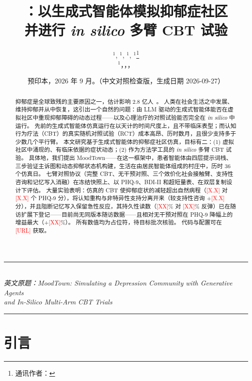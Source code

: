 \documentclass[11pt,a4paper]{article}
\title{\textbf{\sys：以生成式智能体模拟抑郁症社区\\并进行 \emph{in silico} 多臂 CBT 试验}}
\author{%
  \ph{作者 1}$^{1}$,\; \ph{作者 2}$^{1}$,\; \ph{作者 3}$^{1}$,\; \ph{作者 4}$^{1}$\thanks{通讯作者：\ph{email@example.org}}\\
  $^{1}$\ph{院系}，\ph{机构}，\ph{城市}，\ph{国家}
}
\date{预印本，2026 年 9 月。\quad（中文对照检查版，生成日期 2026-09-27）}
\newcommand{\ph}[1]{\textcolor{red}{[#1]}}
\newcommand{\sys}{MoodTown}
\begin{document}
\maketitle

\begin{center}
\rule{\textwidth}{0.5pt}\\[0.3em]
\small\textit{英文原题：MoodTown: Simulating a Depression Community with Generative Agents\\
and In-Silico Multi-Arm CBT Trials}\\[0.3em]
\rule{\textwidth}{0.5pt}
\end{center}

\vspace{0.5em}

\begin{abstract}
\noindent
抑郁症是全球致残的主要原因之一，估计影响 2.8 亿人~\citep{who2022}。
人类在社会生活之中发展、维持抑郁并从中恢复，这引出一个自然的问题：由 LLM 驱动的生成式智能体能否在虚拟社区中重现抑郁障碍的动态过程——以及心理治疗的对照试验能否完全在 \emph{in silico} 中运行。
先前的生成式智能体仿真运行在以天计的时间尺度上，且不带临床表型；而认知行为疗法（CBT）的真实随机对照试验（RCT）成本高昂、历时数月，且很少支持多于少数几个平行臂。
本文研究基于生成式智能体的抑郁症社区仿真，目标有二：(1) 虚拟社区中涌现的、有临床依据的症状动态；(2) 作为方法学工具的 \emph{in silico} 多臂 CBT 试验。
具体地，我们提出 \sys——在这一框架中，患者智能体由四层提示词栈、三步验证主诉图和动态抑郁状态机构建，生活在由居民智能体组成的村庄中，历时 36 个仿真日。
七臂对照协议（完整 CBT、无干预对照、三个效价化社会接触臂、支持性咨询和记忆写入消融）在冻结快照上、以 PHQ-9、BDI-II 和超短量表、在双层复制设计下评估。
大量实验表明：仿真的 CBT 使抑郁症状的减轻超出自然病程（\ph{X.X} 对 \ph{X.X} 个 PHQ-9 分），将认知重构与非特异性支持分离开来（较支持性咨询 +\ph{X.X} 分），并且阻断记忆写入保留急性反应，其持久性读数（\ph{XX}\% 对 \ph{XX}\% 反弹）已在随访扩展下登记——目前尚无同版本随访数据——且相对无干预对照在 PHQ-9 降幅上的增益最大（+\ph{XX}\%）。
所有数值均为占位符，待目标批次核验。
代码与配置可在 \ph{URL} 获取。
\end{abstract}

\section{引言}\label{sec:intro}
\end{document}
